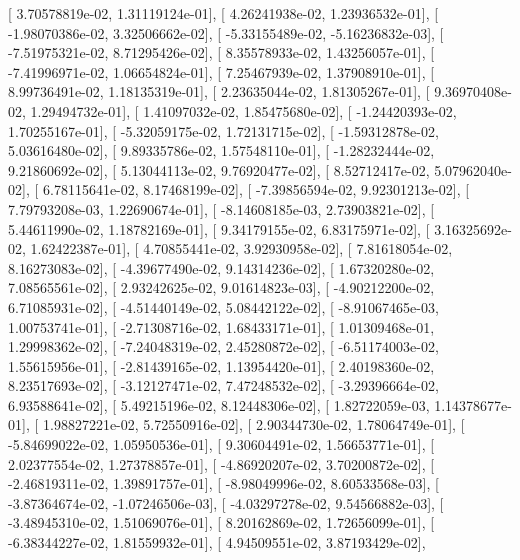 \documentclass{article}
\begin{document}
       [  3.70578819e-02,   1.31119124e-01],
       [  4.26241938e-02,   1.23936532e-01],
       [ -1.98070386e-02,   3.32506662e-02],
       [ -5.33155489e-02,  -5.16236832e-03],
       [ -7.51975321e-02,   8.71295426e-02],
       [  8.35578933e-02,   1.43256057e-01],
       [ -7.41996971e-02,   1.06654824e-01],
       [  7.25467939e-02,   1.37908910e-01],
       [  8.99736491e-02,   1.18135319e-01],
       [  2.23635044e-02,   1.81305267e-01],
       [  9.36970408e-02,   1.29494732e-01],
       [  1.41097032e-02,   1.85475680e-02],
       [ -1.24420393e-02,   1.70255167e-01],
       [ -5.32059175e-02,   1.72131715e-02],
       [ -1.59312878e-02,   5.03616480e-02],
       [  9.89335786e-02,   1.57548110e-01],
       [ -1.28232444e-02,   9.21860692e-02],
       [  5.13044113e-02,   9.76920477e-02],
       [  8.52712417e-02,   5.07962040e-02],
       [  6.78115641e-02,   8.17468199e-02],
       [ -7.39856594e-02,   9.92301213e-02],
       [  7.79793208e-03,   1.22690674e-01],
       [ -8.14608185e-03,   2.73903821e-02],
       [  5.44611990e-02,   1.18782169e-01],
       [  9.34179155e-02,   6.83175971e-02],
       [  3.16325692e-02,   1.62422387e-01],
       [  4.70855441e-02,   3.92930958e-02],
       [  7.81618054e-02,   8.16273083e-02],
       [ -4.39677490e-02,   9.14314236e-02],
       [  1.67320280e-02,   7.08565561e-02],
       [  2.93242625e-02,   9.01614823e-03],
       [ -4.90212200e-02,   6.71085931e-02],
       [ -4.51440149e-02,   5.08442122e-02],
       [ -8.91067465e-03,   1.00753741e-01],
       [ -2.71308716e-02,   1.68433171e-01],
       [  1.01309468e-01,   1.29998362e-02],
       [ -7.24048319e-02,   2.45280872e-02],
       [ -6.51174003e-02,   1.55615956e-01],
       [ -2.81439165e-02,   1.13954420e-01],
       [  2.40198360e-02,   8.23517693e-02],
       [ -3.12127471e-02,   7.47248532e-02],
       [ -3.29396664e-02,   6.93588641e-02],
       [  5.49215196e-02,   8.12448306e-02],
       [  1.82722059e-03,   1.14378677e-01],
       [  1.98827221e-02,   5.72550916e-02],
       [  2.90344730e-02,   1.78064749e-01],
       [ -5.84699022e-02,   1.05950536e-01],
       [  9.30604491e-02,   1.56653771e-01],
       [  2.02377554e-02,   1.27378857e-01],
       [ -4.86920207e-02,   3.70200872e-02],
       [ -2.46819311e-02,   1.39891757e-01],
       [ -8.98049996e-02,   8.60533568e-03],
       [ -3.87364674e-02,  -1.07246506e-03],
       [ -4.03297278e-02,   9.54566882e-03],
       [ -3.48945310e-02,   1.51069076e-01],
       [  8.20162869e-02,   1.72656099e-01],
       [ -6.38344227e-02,   1.81559932e-01],
       [  4.94509551e-02,   3.87193429e-02],
\end{document}
